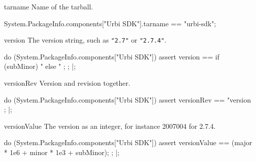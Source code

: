\begin{urbiscriptapi}
\item[tarname] Name of the tarball.
\begin{urbiassert}
System.PackageInfo.components["Urbi SDK"].tarname
  == "urbi-sdk";
\end{urbiassert}


\item[version] The version string, such as \lstinline|"2.7"| or
  \lstinline|"2.7.4"|.
\begin{urbiscript}
do (System.PackageInfo.components["Urbi SDK"])
{
  assert
  {
    version ==
      {
        if (subMinor)
          "%
        else
          "%
      };
  };
}|;
\end{urbiscript}


\item[versionRev] Version and revision together.
\begin{urbiscript}
do (System.PackageInfo.components["Urbi SDK"])
{
  assert
  {
    versionRev
    == "version %
  };
}|;
\end{urbiscript}


\item[versionValue] The version as an integer, for instance 2007004 for
  2.7.4.
\begin{urbiscript}
do (System.PackageInfo.components["Urbi SDK"])
{
  assert
  {
    versionValue == (major * 1e6 + minor * 1e3 + subMinor);
  };
}|;
\end{urbiscript}
\end{urbiscriptapi}

